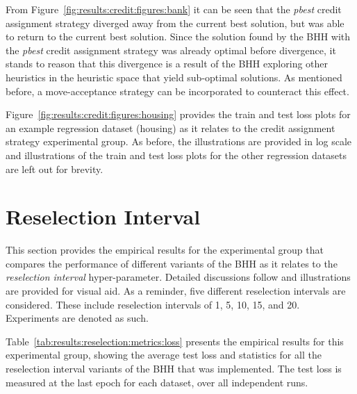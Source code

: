 From Figure~\ref{fig:results:credit:figures:bank} it can be seen that the \textit{pbest} credit assignment strategy diverged away from the current best solution, but was able to return to the current best solution. Since the solution found by the \acs{BHH} with the \textit{pbest} credit assignment strategy was already optimal before divergence, it stands to reason that this divergence is a result of the \acs{BHH} exploring other heuristics in the heuristic space that yield sub-optimal solutions. As mentioned before, a move-acceptance strategy can be incorporated to counteract this effect.

Figure~\ref{fig:results:credit:figures:housing} provides the train and test loss plots for an example regression dataset (housing) as it relates to the credit assignment strategy experimental group. As before, the illustrations are provided in log scale and illustrations of the train and test loss plots for the other regression datasets are left out for brevity.


\section{Reselection Interval}\label{sec:results:reselection}

This section provides the empirical results for the experimental group that compares the performance of different variants of the \acs{BHH} as it relates to the \textit{reselection interval} hyper-parameter. Detailed discussions follow and illustrations are provided for visual aid. As a reminder, five different reselection intervals are considered. These include reselection intervals of 1, 5, 10, 15, and 20. Experiments are denoted as such.

Table~\ref{tab:results:reselection:metrics:loss} presents the empirical results for this experimental group, showing the average test loss and statistics for all the reselection interval variants of the \acs{BHH} that was implemented. The test loss is measured at the last epoch for each dataset, over all independent runs.

